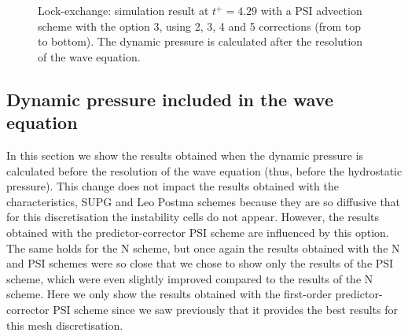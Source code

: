 \begin{figure}[ht]
  \begin{center}
    \caption{Lock-exchange: simulation result at $t^+=4.29$ with a PSI advection scheme with the option 3,
      using 2, 3, 4 and 5 corrections (from top to bottom).
      The dynamic pressure is calculated after the resolution of the wave equation.}
    \label{fig:lock-exchange_dp_no_PSI3}
  \end{center}
\end{figure}

\clearpage

\subsection{Dynamic pressure included in the wave equation}

In this section we show the results obtained when the dynamic pressure is calculated
before the resolution of the wave equation (thus, before the hydrostatic pressure).
This change does not impact the results obtained with the characteristics, SUPG and Leo Postma schemes
because they are so diffusive that for this discretisation the instability cells do not appear.
However, the results obtained with the predictor-corrector PSI scheme are influenced by this option. The same holds
for the N scheme, but once again the results obtained with the N and PSI schemes were so close that
we chose to show only the results of the PSI scheme, which were even slightly improved compared to the results of the N scheme.
Here we only show the results obtained with the first-order predictor-corrector PSI scheme since
we saw previously that it provides the best results for this mesh discretisation.

